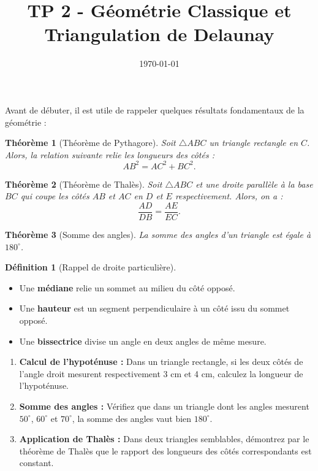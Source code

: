 \documentclass[a4paper,12pt]{article}
\title{TP 2 - Géométrie Classique et Triangulation de Delaunay}
\author{}
\date{\today}
\newtheorem{theorem}{Théorème}[section]
\theoremstyle{definition}
\newtheorem{definition}{Définition}[section]
\begin{document}
\makeonlytitle


Avant de débuter, il est utile de rappeler quelques résultats fondamentaux de la géométrie :

\begin{theorem}[Théorème de Pythagore]
Soit \( \triangle ABC \) un triangle rectangle en \(C\). Alors, la relation suivante relie les longueurs des côtés :
\[
AB^2 = AC^2 + BC^2.
\]
\end{theorem}

\begin{theorem}[Théorème de Thalès]
Soit \( \triangle ABC \) et une droite parallèle à la base \(BC\) qui coupe les côtés \(AB\) et \(AC\) en \(D\) et \(E\) respectivement. Alors, on a :
\[
\frac{AD}{DB} = \frac{AE}{EC}.
\]
\]
\end{theorem}

\begin{theorem}[Somme des angles]
La somme des angles d’un triangle est égale à \(180^\circ\).
\end{theorem}

\begin{definition}[Rappel de droite particulière]
\begin{itemize}
  \item Une \textbf{médiane} relie un sommet au milieu du côté opposé.
  \item Une \textbf{hauteur} est un segment perpendiculaire à un côté issu du sommet opposé.
  \item Une \textbf{bissectrice} divise un angle en deux angles de même mesure.
\end{itemize}
\end{definition}


\bigskip

\begin{enumerate}
  \item \textbf{Calcul de l'hypoténuse :} Dans un triangle rectangle, si les deux côtés de l'angle droit mesurent respectivement 3 cm et 4 cm, calculez la longueur de l'hypoténuse.
  \item \textbf{Somme des angles :} Vérifiez que dans un triangle dont les angles mesurent \(50^\circ\), \(60^\circ\) et \(70^\circ\), la somme des angles vaut bien \(180^\circ\).
  \item \textbf{Application de Thalès :} Dans deux triangles semblables, démontrez par le théorème de Thalès que le rapport des longueurs des côtés correspondants est constant.
\end{enumerate}
\end{document}
